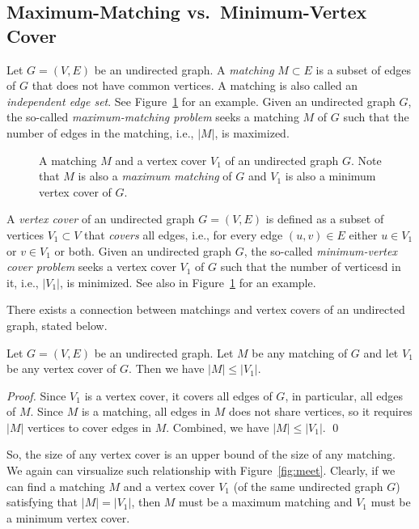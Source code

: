 \subsection*{Maximum-Matching vs.\ Minimum-Vertex Cover}

Let $G = (V, E)$ be an undirected graph. A \emph{matching} $M \subset E$
is a subset of edges of $G$ that does not have common vertices.
A matching is also called an \emph{independent edge set}.
See Figure~\ref{fig:matching} for an example.
Given an undirected graph $G$, the so-called \emph{maximum-matching problem}
seeks a matching $M$ of $G$ such that the number of edges in the matching, i.e., $|M|$,
is maximized.

\begin{figure}[h]
\centering{}
\caption{A matching $M$ and a vertex cover $V_1$ of an undirected graph $G$.
Note that $M$ is also a \emph{maximum matching} of $G$ and $V_1$ is also a minimum vertex cover of $G$.}
\label{fig:matching}
\end{figure}

A \emph{vertex cover} of an undirected graph $G = (V, E)$ is defined
as a subset of vertices $V_1\subset V$ that \emph{covers} all edges, i.e., for every edge $(u, v)\in E$ either
$u\in V_1$ or $v\in V_1$ or both.
Given an undirected graph $G$, the so-called \emph{minimum-vertex cover problem}
seeks a vertex cover $V_1$ of $G$ such that the number of verticesd in it, i.e., $|V_1|$, is minimized.
See also in Figure~\ref{fig:matching} for an example.

There exists a connection between matchings and vertex covers of an undirected graph, stated below.

\begin{claim}
Let $G = (V, E)$ be an undirected graph. Let $M$ be any matching of $G$ and let $V_1$ be any vertex cover of $G$.
Then we have $|M| \le |V_1|$.
\end{claim}

\emph{Proof.} Since $V_1$ is a vertex cover, it covers all edges of $G$, in particular, all edges of $M$.
Since $M$ is a matching, all edges in $M$ does not share vertices, so it requires $|M|$ vertices to cover edges in $M$.
Combined, we have $|M| \le |V_1|$. \qed

So, the size of any vertex cover is an upper bound of the size of any matching. We again can virsualize
such relationship with Figure~\ref{fig:meet}. Clearly, if we can find a matching $M$ and a vertex cover $V_1$
(of the same undirected graph $G$) satisfying that $|M| = |V_1|$, then $M$ must be a maximum matching 
and $V_1$ must be a minimum vertex cover.

